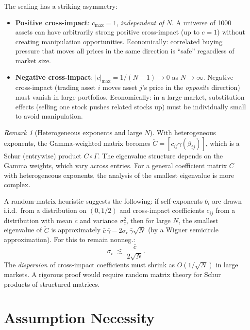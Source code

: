\documentclass[12pt]{article}
\theoremstyle{definition}
\theoremstyle{remark}
\newtheorem{remark}[theorem]{Remark}
\newcommand{\bC}{\widetilde{C}}
\begin{document}
The scaling has a striking asymmetry:
\begin{itemize}[nosep]
\item \textbf{Positive cross-impact}: $c_{\max} = 1$, \emph{independent of $N$}.
  A universe of 1000 assets can have arbitrarily strong positive cross-impact
  (up to $c=1$) without creating manipulation opportunities.  Economically:
  correlated buying pressure that moves all prices in the same direction is
  ``safe'' regardless of market size.

\item \textbf{Negative cross-impact}: $|c|_{\max} = 1/(N-1)\to 0$ as $N\to\infty$.
  Negative cross-impact (trading asset $i$ moves asset $j$'s price in the
  \emph{opposite} direction) must vanish in large portfolios.  Economically:
  in a large market, substitution effects (selling one stock pushes related
  stocks up) must be individually small to avoid manipulation.
\end{itemize}

\begin{remark}[Heterogeneous exponents and large $N$]\label{rem:largeN_hetero}
With heterogeneous exponents, the Gamma-weighted matrix becomes
$\bC = [c_{ij}\gamma(\beta_{ij})]$, which is a Schur (entrywise) product
$C\circ\Gamma$.  The eigenvalue structure depends on the Gamma weights,
which vary across entries.  For a general coefficient matrix $C$ with
heterogeneous exponents, the analysis of the smallest eigenvalue is more
complex.

A random-matrix heuristic suggests the following: if self-exponents $b_i$ are
drawn i.i.d.\ from a distribution on $(0,1/2)$ and cross-impact coefficients
$c_{ij}$ from a distribution with mean $\bar{c}$ and variance $\sigma_c^2$,
then for large $N$, the smallest eigenvalue of $\bC$ is approximately
$\bar{c}\,\bar{\gamma} - 2\sigma_c\,\bar{\gamma}\sqrt{N}$
(by a Wigner semicircle approximation).  For this to remain nonneg.:
\begin{equation}\label{eq:dispersion_bound}
  \sigma_c \;\lesssim\; \frac{\bar{c}}{2\sqrt{N}}.
\end{equation}
The \emph{dispersion} of cross-impact coefficients must shrink as $O(1/\sqrt{N})$
in large markets.  A rigorous proof would require random matrix theory for
Schur products of structured matrices.
\end{remark}


\section{Assumption Necessity}\label{sec:necessity}
\end{document}
